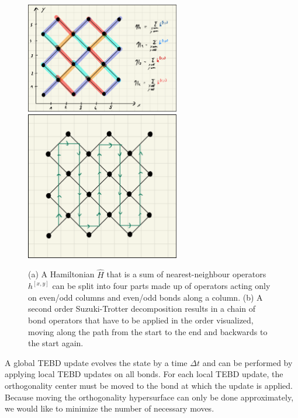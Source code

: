 \begin{figure}
	\centering
	\subcaptionbox{\label{fig:disoTPS_TEBD_global_update_TEBD1_splitting}}
	{%
		\includegraphics[width=0.6\textwidth]{figures/disoTPS/disoTPS_TEBD_global_update_TEBD1_splitting.jpeg}
	}
	\subcaptionbox{\label{fig:disoTPS_TEBD_global_update_TEBD2_chain}}
	{%
		\includegraphics[width=0.6\textwidth]{figures/disoTPS/disoTPS_TEBD_global_update_TEBD2_chain.jpeg}
	}
	\caption{(a) A Hamiltonian $\hat{H}$ that is a sum of nearest-neighbour operators $h^{[x,y]}$ can be split into four parts made up of operators acting only on even/odd columns and even/odd bonds along a column. (b) A second order Suzuki-Trotter decomposition results in a chain of bond operators that have to be applied in the order visualized, moving along the path from the start to the end and backwards to the start again.}
	\label{fig:disoTPS_TEBD_global_update_TEBD1_splitting_and_TEBD2_chain}
\end{figure}
A global TEBD update evolves the state by a time $\Delta t$ and can be performed by applying local TEBD updates on all bonds. For each local TEBD update, the orthogonality center must be moved to the bond at which the update is applied. Because moving the orthogonality hypersurface can only be done approximately, we would like to minimize the number of necessary moves. \par
